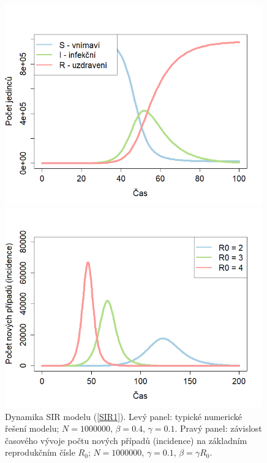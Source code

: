 \begin{figure}[h]
\begin{center}
	\begin{minipage}[m]{0.45\linewidth}
		\includegraphics[width=0.99\textwidth]{pic/figsir1.png}
	\end{minipage}
	\hspace{2ex}
	\begin{minipage}[m]{0.45\linewidth}
		\includegraphics[width=0.99\textwidth]{pic/figsir2.png}
	\end{minipage}
\end{center}
\caption{Dynamika SIR modelu (\ref{SIR1}). Levý panel: typické numerické řešení modelu; $N=1000000$, $\beta=0.4$, $\gamma=0.1$. Pravý panel: závislost časového vývoje počtu nových případů (incidence) na základním reprodukčním čísle $R_0$; $N=1000000$, $\gamma=0.1$, $\beta=\gamma R_0$.}
\label{kendrick1}
\end{figure}

